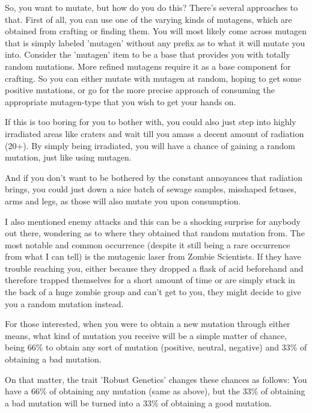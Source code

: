 So, you want to mutate, but how do you do this?
There's several approaches to that. First of all, you can use one of the varying kinds of mutagens, which are obtained from crafting or finding them. You will most likely come across mutagen that is simply labeled 'mutagen' without any prefix as to what it will mutate you into. Consider the 'mutagen' item to be a base that provides you with totally random mutations. More refined mutagens require it as a base component for crafting. So you can either mutate with mutagen at random, hoping to get some positive mutations, or go for the more precise approach of consuming the appropriate mutagen-type that you wish to get your hands on.

If this is too boring for you to bother with, you could also just step into highly irradiated areas like craters and wait till you amass a decent amount of radiation (20+). By simply being irradiated, you will have a chance of gaining a random mutation, just like using mutagen.

And if you don't want to be bothered by the constant annoyances that radiation brings, you could just down a nice batch of sewage samples, misshaped fetuses, arms and legs, as those will also mutate you upon consumption.

I also mentioned enemy attacks and this can be a shocking surprise for anybody out there, wondering as to where they obtained that random mutation from. The most notable and common occurrence (despite it still being a rare occurrence from what I can tell) is the mutagenic laser from Zombie Scientists. If they have trouble reaching you, either because they dropped a flask of acid beforehand and therefore trapped themselves for a short amount of time or are simply stuck in the back of a huge zombie group and can't get to you, they might decide to give you a random mutation instead.

For those interested, when you were to obtain a new mutation through either means, what kind of mutation you receive will be a simple matter of chance, being 66\% to obtain any sort of mutation (positive, neutral, negative) and 33\% of obtaining a bad mutation.

On that matter, the trait 'Robust Genetics' changes these chances as follows: You have a 66\% of obtaining any mutation (same as above), but the 33\% of obtaining a bad mutation will be turned into a 33\% of obtaining a good mutation.

